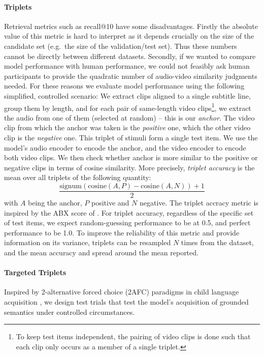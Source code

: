 \paragraph{Triplets}
Retrieval metrics such as recall@10 have some disadvantages. Firstly
the absolute value of this metric is hard to interpret as it depends
crucially on the size of the candidate set (e.g.\ the size of the
validation/test set). Thus these numbers cannot be directly between
different datasets. Secondly, if
we wanted to compare model performance with human performance, we
could not feasibly ask human participants to provide the quadratic
number of audio-video similarity judgments needed. For these reasons
we evaluate model performance using the following simplified,
controlled scenario: We extract clips aligned to a single subtitle
line, group them by length, and for each pair of same-length video
clips\footnote{To keep test items independent, the pairing of video
  clips is done such that each clip only occurs as a member of a single
  triplet.}, we extract the audio from one of them (selected at
random) -- this is our {\it anchor}. The video clip from which the
anchor was taken is the {\it positive} one, which the other video clip
is the {\it negative} one. This triplet of stimuli form a single test
item.  We use the model's audio encoder to encode the anchor, and the
video encoder to encode both video clips. We then check whether anchor
is more similar to the positive or negative clips in terms of cosine
similarity.  More precisely, {\it triplet accuracy} is the mean over
all triplets of the following quantity:
\begin{equation}
  \frac{\mathrm{signum}(\mathrm{cosine}(A, P) - \mathrm{cosine}(A, N)) + 1}{2}
  \label{eq:triplet-acc}
\end{equation}
with $A$ being the anchor, $P$ positive and $N$ negative. The triplet
accracy metric is inspired by the ABX score of \citet{schatz2016abx}.
For triplet accuracy, regardless of the specific set of test items, we
expect random-guessing performance to be at 0.5, and perfect
performance to be 1.0.  To improve the reliability of this metric and
provide information on its variance, triplets can be resampled $N$
times from the dataset, and the mean accuracy and spread around the mean
reported.

\paragraph{Targeted Triplets}
Inspired by 2-alternative forced choice (2AFC) paradigms in child
language acquisition \citep{noble2011comprehension, bergelson20126},
we design test trials that test the model's acquisition of grounded
semantics under controlled circumstances.


